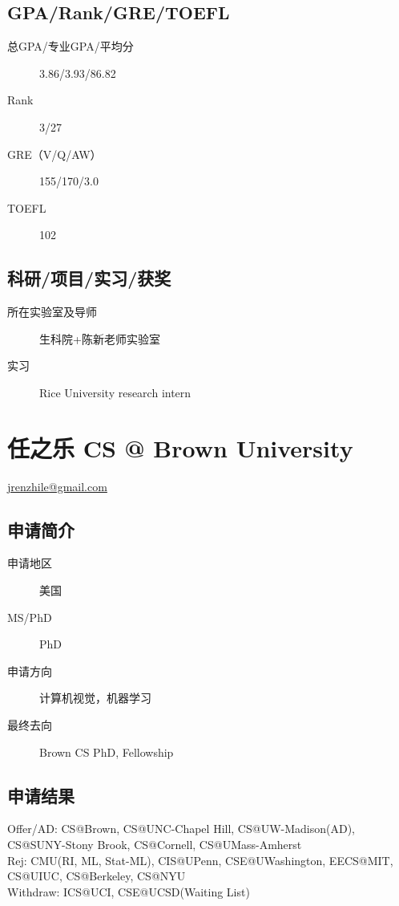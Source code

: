\documentclass[11pt,fleqn,openany]{book} %
\begin{document}
\subsection*{GPA/Rank/GRE/TOEFL}
\begin{description}
\item[总GPA/专业GPA/平均分] 3.86/3.93/86.82
\item[Rank] 3/27
\item[GRE（V/Q/AW）] 155/170/3.0
\item[TOEFL] 102
\end{description}

\subsection*{科研/项目/实习/获奖}
\begin{description}
\item[所在实验室及导师] 生科院+陈新老师实验室
\item[实习] Rice University research intern
\end{description}
\clearpage
\section{任之乐 CS @ Brown University}
\hfill \href{mailto:jrenzhile@gmail.com}{jrenzhile@gmail.com}

\noindent\begin{minipage}[t]{0.45\textwidth}
\subsection*{申请简介}
\begin{description}
\item[申请地区] 美国
\item[MS/PhD] PhD
\item[申请方向] 计算机视觉，机器学习
\item[最终去向] Brown CS PhD, Fellowship
\end{description}
\end{minipage}
\hfill
\begin{minipage}[t]{0.45\textwidth}
\subsection*{申请结果}
\noindent Offer/AD: CS@Brown, CS@UNC-Chapel Hill, CS@UW-Madison(AD),\\
CS@SUNY-Stony Brook, CS@Cornell, CS@UMass-Amherst\\
Rej: CMU(RI, ML, Stat-ML), CIS@UPenn, CSE@UWashington, EECS@MIT,\\
CS@UIUC, CS@Berkeley, CS@NYU\\
Withdraw: ICS@UCI, CSE@UCSD(Waiting List)
\end{minipage}
\end{document}
